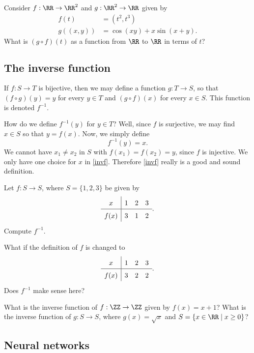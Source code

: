 \documentclass{article}
\begin{document}
  
\beginshex
Consider $f: \RR\rightarrow \RR^2$ and $g: \RR^2\rightarrow \RR$ given by
\begin{align*}
  f(t) &= (t^2, t^3)\\
  g((x, y)) &= \cos(x y) + x \sin(x + y).
\end{align*}
What is $(g\circ f)(t)$ as a function from $\RR$ to $\RR$ in terms of $t$?
\endshex

\subsection{The inverse function}

If $f:S\rightarrow T$ is bijective, then we may define a function $g: T\rightarrow S$, so
that $(f\circ g)(y) = y$ for every $y\in T$ and $(g\circ f)(x)$ for every $x\in S$. This
function is denoted $f^{-1}$.

How do we define $f^{-1}(y)$ for $y\in T$? Well, since $f$ is surjective, we may find
$x\in S$ so that $y = f(x)$. Now, we simply define
\begin{equation}\label{invf}
f^{-1}(y) = x.
\end{equation}
We cannot have $x_1 \neq x_2$ in $S$ with $f(x_1) = f(x_2) = y$, since $f$ is injective. We only have one choice for
$x$ in \eqref{invf}. Therefore \eqref{invf} really is a good and sound definition.

\beginshex
Let $f: S\rightarrow S$, where $S = \{1, 2, 3\}$ be given by
$$
\def\arraystretch{1.5}
\begin{array}{c|ccccccc}
x & 1 & 2 & 3\\ \hline
f(x) & 3 & 1 & 2
\end{array}.
$$
Compute $f^{-1}$.

What if the definition of $f$ is changed to
$$
\def\arraystretch{1.5}
\begin{array}{c|ccccccc}
x & 1 & 2 & 3\\ \hline
f(x) & 3 & 2 & 2
\end{array}.
$$
Does $f^{-1}$ make sense here?
\endshex

\beginshex
What is the inverse function of $f:\ZZ\rightarrow \ZZ$ given by $f(x) = x + 1$?
What is the inverse function of $g: S \rightarrow S$, where $g(x) = \sqrt{x}$ and
$S = \{x\in \RR\mid x\geq 0\}$?
\endshex


\subsection{Neural networks}
\end{document}
